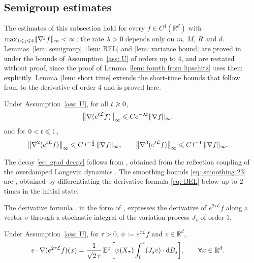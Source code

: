 \subsection{Semigroup estimates}
\label{sec: semigroup}

The estimates of this subsection hold for every $f \in C^4(\mathbb R^d)$ with $\max_{1 \leqslant j \leqslant 4} \lVert \nabla^j f \rVert_\infty < \infty$; the rate $\lambda > 0$ depends only on $m$, $M$, $R$ and $d$. Lemmas~\ref{lem: semigroup}, \ref{lem: BEL} and \ref{lem: variance bound} are proved in \citep[Appendix~A]{ye2026mse} under the bounds of Assumption~\ref{ass: U} of orders up to $4$, and are restated without proof, since the proof of Lemma~\ref{lem: fourth from lipschitz} uses them explicitly. Lemma~\ref{lem: short time} extends the short-time bounds that follow from \citep[Lemma~6]{ye2026mse} to the derivative of order $4$ and is proved here.

\begin{lemma}
\label{lem: semigroup}
    Under Assumption~\ref{ass: U}, for all $t \geqslant 0$,
    \begin{equation}
        \bigl\| \nabla (e^{t\mathcal L} f) \bigr\|_\infty \leqslant C e^{-\lambda t} \lVert \nabla f \rVert_\infty ;
        \label{eq: grad decay}
    \end{equation}
    and for $0 < t \leqslant 1$,
    \begin{equation}
        \bigl\| \nabla^2 (e^{t\mathcal L} f) \bigr\|_\infty \leqslant C\, t^{-\frac12}\, \lVert \nabla f \rVert_\infty , \qquad
        \bigl\| \nabla^3 (e^{t\mathcal L} f) \bigr\|_\infty \leqslant C\, t^{-1}\, \lVert \nabla f \rVert_\infty .
        \label{eq: smoothing 23}
    \end{equation}
\end{lemma}

The decay \eqref{eq: grad decay} follows from \citep[Lemma~5]{ye2026mse}, obtained from the reflection coupling of the overdamped Langevin dynamics \citep{eberle2016reflection}. The smoothing bounds \eqref{eq: smoothing 23} are \citep[Lemmas~8 and~9]{ye2026mse}, obtained by differentiating the derivative formula \eqref{eq: BEL} below up to $2$ times in the initial state.

The derivative formula \citep{elworthy1994formulae}, in the form of \citep[Lemma~7]{ye2026mse}, expresses the derivative of $e^{2\tau\mathcal L} f$ along a vector $v$ through a stochastic integral of the variation process $J_s$ of order $1$.

\begin{lemma}
\label{lem: BEL}
    Under Assumption~\ref{ass: U}, for $\tau > 0$, $\psi := e^{\tau\mathcal L} f$ and $v \in \mathbb R^d$,
    \begin{equation}
        v \cdot \nabla (e^{2\tau\mathcal L} f)(x) = \frac{1}{\sqrt2\,\tau}\, \mathbb E^x \biggl[ \psi(X_\tau) \int_0^\tau (J_s v) \cdot \mathrm{d} B_s \biggr] , \qquad \forall x \in \mathbb R^d .
        \label{eq: BEL}
    \end{equation}
\end{lemma}

